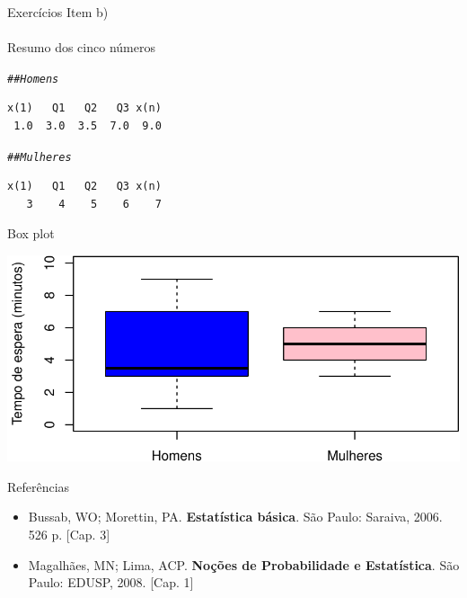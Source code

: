 \documentclass[10pt]{beamer}\usepackage[]{graphicx}\usepackage[]{color}
\makeatletter
\newcommand{\hlcom}[1]{\textcolor[rgb]{0.678,0.584,0.686}{\textit{#1}}}%
\newenvironment{kframe}{%
 \def\at@end@of@kframe{}%
 \ifinner\ifhmode%
  \def\at@end@of@kframe{\end{minipage}}%
  \begin{minipage}{\columnwidth}%
 \fi\fi%
 \def\FrameCommand##1{\hskip\@totalleftmargin \hskip-\fboxsep
 \colorbox{shadecolor}{##1}\hskip-\fboxsep
     \hskip-\linewidth \hskip-\@totalleftmargin \hskip\columnwidth}%
 \MakeFramed {\advance\hsize-\width
   \@totalleftmargin\z@ \linewidth\hsize
   \@setminipage}}%
 {\par\unskip\endMakeFramed%
 \at@end@of@kframe}
\newenvironment{knitrout}{}{} %
\theoremstyle{definition}
\makeatother
\begin{document}
\begin{frame}[fragile]{Exercícios}
Item b) \\~\\
Resumo dos cinco números
\begin{knitrout}\footnotesize
{}\color{fgcolor}\begin{kframe}
\begin{alltt}
\hlcom{## Homens}
\end{alltt}
\begin{verbatim}
x(1)   Q1   Q2   Q3 x(n) 
 1.0  3.0  3.5  7.0  9.0 
\end{verbatim}
\begin{alltt}
\hlcom{## Mulheres}
\end{alltt}
\begin{verbatim}
x(1)   Q1   Q2   Q3 x(n) 
   3    4    5    6    7 
\end{verbatim}
\end{kframe}
\end{knitrout}
Box plot
\begin{knitrout}\footnotesize
{}\color{fgcolor}

{\centering \includegraphics[width=.5\textwidth]{figure/unnamed-chunk-27-1} 

}



\end{knitrout}
\end{frame}

\begin{frame}{Referências}
  \begin{itemize}
  \item Bussab, WO; Morettin, PA. \textbf{Estatística básica}. São
    Paulo: Saraiva, 2006. 526 p. [Cap. 3]
  \item Magalhães, MN; Lima, ACP. \textbf{Noções de Probabilidade e
    Estatística}. São Paulo: EDUSP, 2008. [Cap. 1]
  \end{itemize}
\end{frame}
\end{document}
